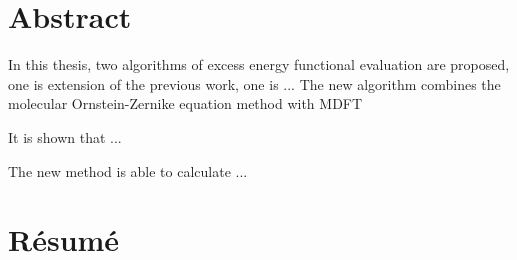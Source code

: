 \begingroup
\let\clearpage\relax
\let\cleardoublepage\relax



\chapter*{Abstract}

In this thesis, two algorithms of excess energy functional evaluation
are proposed, one is extension of the previous work, one is ... The
new algorithm combines the molecular Ornstein-Zernike equation method
with MDFT

It is shown that ...

The new method is able to calculate ...

\vfill{}




\chapter*{Résumé}

\vfill{}


\endgroup
